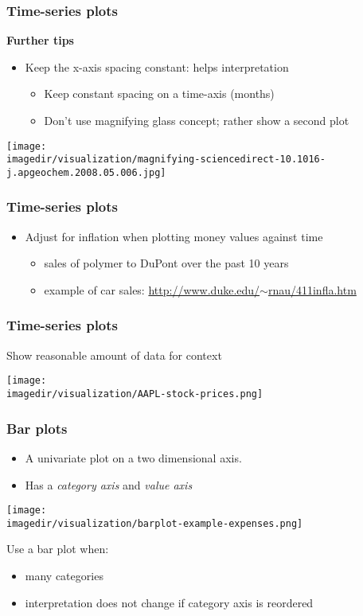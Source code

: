 \begin{frame}\frametitle{Time-series plots}
	
	\textbf{Further tips}
	\begin{itemize}
		\item	Keep the x-axis spacing constant: helps interpretation 
		\begin{itemize}
			\item	Keep constant spacing on a time-axis (months)
			\item	Don't use magnifying glass concept; rather show a second plot
		\end{itemize}
	\end{itemize}
	\begin{center}
		\texttt{[image: \\imagedir/visualization/magnifying-sciencedirect-10.1016-j.apgeochem.2008.05.006.jpg]}
	\end{center}
	\vspace{-14pt}
\end{frame}

\begin{frame}\frametitle{Time-series plots}
	\begin{itemize}
		\item	Adjust for inflation when plotting money values against time 
		\begin{itemize}
			\item	sales of polymer to DuPont over the past 10 years 
			\item	example of car sales: \href{http://www.duke.edu/~rnau/411infla.htm}{http://www.duke.edu/$\sim$rnau/411infla.htm} 
		\end{itemize}
	\end{itemize}
\end{frame}

\begin{frame}\frametitle{Time-series plots}
	
	Show reasonable amount of data for context 
	\begin{center}
		\texttt{[image: \\imagedir/visualization/AAPL-stock-prices.png]}
	\end{center}
\end{frame}

\begin{frame}\frametitle{Bar plots}
	\begin{itemize}
		\item	A univariate plot on a two dimensional axis. 
		\item	Has a \emph{category axis} and \emph{value axis} 
	\end{itemize}
	\begin{center}
		\texttt{[image: \\imagedir/visualization/barplot-example-expenses.png]}
	\end{center}
	\vspace{-8pt}
	Use a bar plot when: 
	\begin{itemize}
		\item	many categories 
		\item	interpretation does not change if category axis is reordered 
	\end{itemize}
\end{frame}

